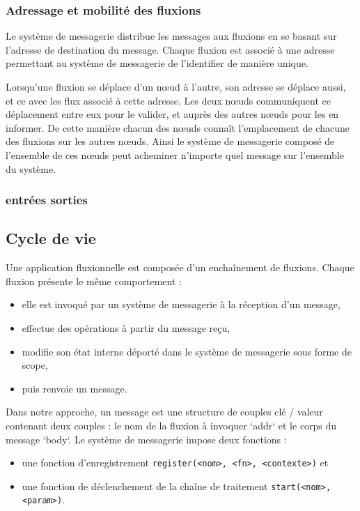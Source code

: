 		\subsubsection{Adressage et mobilité des fluxions}

			Le système de messagerie distribue les messages aux fluxions en se basant sur l'adresse de destination du message.
			Chaque fluxion est associé à une adresse permettant au système de messagerie de l'identifier de manière unique.

			Lorsqu'une fluxion se déplace d'un nœud à l'autre, son adresse se déplace aussi, et ce avec les flux associé à cette adresse.
			Les deux nœuds communiquent ce déplacement entre eux pour le valider, et auprès des autres nœuds pour les en informer.
			De cette manière chacun des nœuds connaît l'emplacement de chacune des fluxions sur les autres nœuds.
			Ainsi le système de messagerie composé de l'ensemble de ces nœuds peut acheminer n'importe quel message sur l'ensemble du système.

		\subsubsection{entrées \/ sorties}

	\subsection{Cycle de vie}

		Une application fluxionnelle est composée d'un enchaînement de fluxions.
		Chaque fluxion présente le même comportement : 
		\begin{itemize}
			\item elle est invoqué par un système de messagerie à la réception d'un message,
			\item effectue des opérations à partir du message reçu,
			\item modifie son état interne déporté dans le système de messagerie sous forme de scope,
			\item  puis renvoie un message.
		\end{itemize}

		Dans notre approche, un message est une structure de couples clé / valeur  contenant deux couples : le nom de la fluxion à invoquer `addr` et le corps du message `body`.
		Le système de messagerie impose deux fonctions :
		\begin{itemize}
			\item une fonction d'enregistrement
		    \lstinline|register(<nom>, <fn>, <contexte>)| et
			\item une fonction de déclenchement de la chaîne de traitement
		    \lstinline|start(<nom>,<param>)|.
		\end{itemize}


